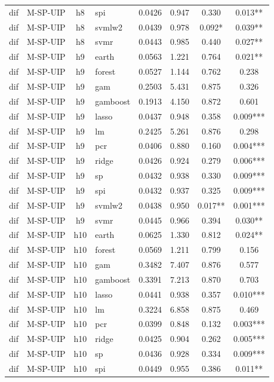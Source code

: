 \begin{ThreePartTable}
\begin{longtable}[t]{llclcccc}
dif & M-SP-UIP & h8 & spi & 0.0426 & 0.947 & 0.330 & 0.013**\\
dif & M-SP-UIP & h8 & svmlw2 & 0.0439 & 0.978 & 0.092* & 0.039**\\
dif & M-SP-UIP & h8 & svmr & 0.0443 & 0.985 & 0.440 & 0.027**\\
\addlinespace
dif & M-SP-UIP & h9 & earth & 0.0563 & 1.221 & 0.764 & 0.021**\\
dif & M-SP-UIP & h9 & forest & 0.0527 & 1.144 & 0.762 & 0.238\\
dif & M-SP-UIP & h9 & gam & 0.2503 & 5.431 & 0.875 & 0.326\\
dif & M-SP-UIP & h9 & gamboost & 0.1913 & 4.150 & 0.872 & 0.601\\
dif & M-SP-UIP & h9 & lasso & 0.0437 & 0.948 & 0.358 & 0.009***\\
dif & M-SP-UIP & h9 & lm & 0.2425 & 5.261 & 0.876 & 0.298\\
dif & M-SP-UIP & h9 & pcr & 0.0406 & 0.880 & 0.160 & 0.004***\\
dif & M-SP-UIP & h9 & ridge & 0.0426 & 0.924 & 0.279 & 0.006***\\
dif & M-SP-UIP & h9 & sp & 0.0432 & 0.938 & 0.330 & 0.009***\\
dif & M-SP-UIP & h9 & spi & 0.0432 & 0.937 & 0.325 & 0.009***\\
dif & M-SP-UIP & h9 & svmlw2 & 0.0438 & 0.950 & 0.017** & 0.001***\\
dif & M-SP-UIP & h9 & svmr & 0.0445 & 0.966 & 0.394 & 0.030**\\
\addlinespace
dif & M-SP-UIP & h10 & earth & 0.0625 & 1.330 & 0.812 & 0.024**\\
dif & M-SP-UIP & h10 & forest & 0.0569 & 1.211 & 0.799 & 0.156\\
dif & M-SP-UIP & h10 & gam & 0.3482 & 7.407 & 0.876 & 0.577\\
dif & M-SP-UIP & h10 & gamboost & 0.3391 & 7.213 & 0.870 & 0.703\\
dif & M-SP-UIP & h10 & lasso & 0.0441 & 0.938 & 0.357 & 0.010***\\
dif & M-SP-UIP & h10 & lm & 0.3224 & 6.858 & 0.875 & 0.469\\
dif & M-SP-UIP & h10 & pcr & 0.0399 & 0.848 & 0.132 & 0.003***\\
dif & M-SP-UIP & h10 & ridge & 0.0425 & 0.904 & 0.262 & 0.005***\\
dif & M-SP-UIP & h10 & sp & 0.0436 & 0.928 & 0.334 & 0.009***\\
dif & M-SP-UIP & h10 & spi & 0.0449 & 0.955 & 0.386 & 0.011**\\

\end{longtable}
\end{ThreePartTable}
